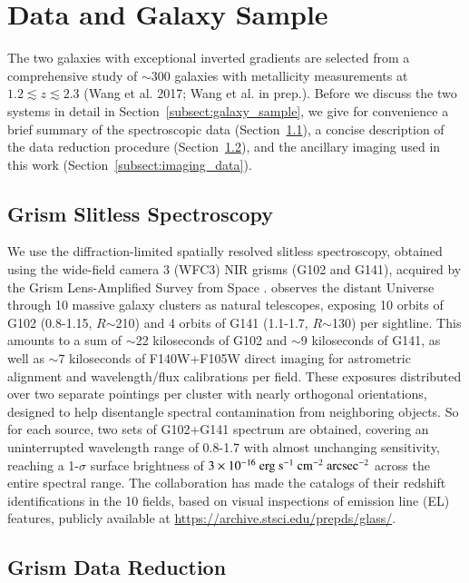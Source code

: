 \section{Data and Galaxy Sample}\label{sect:data}

The two galaxies with exceptional inverted gradients are selected from a comprehensive study of $\sim$300 galaxies with 
metallicity measurements at $1.2\lesssim z\lesssim2.3$ (Wang et al. 2017; Wang et al. in prep.). Before we 
discuss the two systems in detail in Section~\ref{subsect:galaxy_sample}, we give for convenience a brief 
summary of the spectroscopic data (Section~\ref{subsect:grism_data}), a concise description of the data 
reduction procedure (Section~\ref{subsect:grism_reduce}), and the ancillary imaging used in this work 
(Section~\ref{subsect:imaging_data}).

\subsection{\hst Grism Slitless Spectroscopy}\label{subsect:grism_data}

We use the diffraction-limited spatially resolved slitless spectroscopy, obtained using the \hst wide-field 
camera 3 (WFC3) NIR grisms (G102 and G141), acquired by the Grism Lens-Amplified Survey from Space
\citep[\glass,][]{2014ApJ...782L..36S,2015ApJ...812..114T}.
\glass observes the distant Universe through 10 massive galaxy clusters as natural telescopes, exposing 10 orbits of G102
(0.8-1.15\micron, $R$$\sim$210) and 4 orbits of G141 (1.1-1.7\micron, $R$$\sim$130) per sightline.
This amounts to a sum of $\sim$22 kiloseconds of G102 and $\sim$9 kiloseconds of G141, as well as $\sim$7 
kiloseconds of
F140W+F105W direct imaging for astrometric alignment and wavelength/flux calibrations per field.
These exposures distributed over two separate pointings per cluster with nearly orthogonal orientations,
designed to help disentangle spectral contamination from neighboring objects.
So for each source, two sets of G102+G141 spectrum are obtained, covering an uninterrupted wavelength range of 0.8-1.7\micron
with almost unchanging sensitivity, reaching a 1-$\sigma$ surface brightness of $3\times10^{-16}~\rm erg~s^{-1}~cm^{-2}~arcsec^{-2}$ across the entire
spectral range.
The \glass collaboration has made the catalogs of their redshift identifications in the 10 fields, based on visual inspections of
emission line (EL) features, publicly available at \url{https://archive.stsci.edu/prepds/glass/}.

\subsection{Grism Data Reduction}\label{subsect:grism_reduce}

